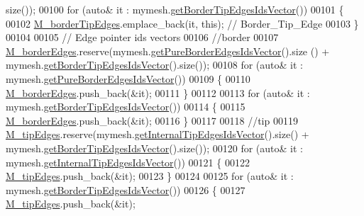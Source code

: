 \begin{DoxyCode}
      size());
00100     \textcolor{keywordflow}{for} (\textcolor{keyword}{auto}& it : mymesh.\hyperlink{classFVCode3D_1_1Rigid__Mesh_a12c92b683cfb3d9ac2645f038a8c6220}{getBorderTipEdgesIdsVector}())
00101     \{
00102         \hyperlink{classFVCode3D_1_1Rigid__Mesh_a712ea50f5237025e92af21799c5ec31b}{M\_borderTipEdges}.emplace\_back(it, \textcolor{keyword}{this}); \textcolor{comment}{// Border\_Tip\_Edge}
00103     \}
00104 
00105     \textcolor{comment}{// Edge pointer ids vectors}
00106     \textcolor{comment}{//border}
00107     \hyperlink{classFVCode3D_1_1Rigid__Mesh_af9ba7882baec8f8e5e7693a38f3cbc9b}{M\_borderEdges}.reserve(mymesh.\hyperlink{classFVCode3D_1_1Rigid__Mesh_ad18503d8be34525dd4ccbd7d6bc972c0}{getPureBorderEdgesIdsVector}().size
      () + mymesh.\hyperlink{classFVCode3D_1_1Rigid__Mesh_a12c92b683cfb3d9ac2645f038a8c6220}{getBorderTipEdgesIdsVector}().size());
00108     \textcolor{keywordflow}{for} (\textcolor{keyword}{auto}& it : mymesh.\hyperlink{classFVCode3D_1_1Rigid__Mesh_ad18503d8be34525dd4ccbd7d6bc972c0}{getPureBorderEdgesIdsVector}())
00109     \{
00110         \hyperlink{classFVCode3D_1_1Rigid__Mesh_af9ba7882baec8f8e5e7693a38f3cbc9b}{M\_borderEdges}.push\_back(&it);
00111     \}
00112 
00113     \textcolor{keywordflow}{for} (\textcolor{keyword}{auto}& it : mymesh.\hyperlink{classFVCode3D_1_1Rigid__Mesh_a12c92b683cfb3d9ac2645f038a8c6220}{getBorderTipEdgesIdsVector}())
00114     \{
00115         \hyperlink{classFVCode3D_1_1Rigid__Mesh_af9ba7882baec8f8e5e7693a38f3cbc9b}{M\_borderEdges}.push\_back(&it);
00116     \}
00117 
00118     \textcolor{comment}{//tip}
00119     \hyperlink{classFVCode3D_1_1Rigid__Mesh_a973940e6cd68e9980afec97fe94a70f4}{M\_tipEdges}.reserve(mymesh.\hyperlink{classFVCode3D_1_1Rigid__Mesh_a167962718f17ff75f349a1a072d1627b}{getInternalTipEdgesIdsVector}().size() +
       mymesh.\hyperlink{classFVCode3D_1_1Rigid__Mesh_a12c92b683cfb3d9ac2645f038a8c6220}{getBorderTipEdgesIdsVector}().size());
00120     \textcolor{keywordflow}{for} (\textcolor{keyword}{auto}& it : mymesh.\hyperlink{classFVCode3D_1_1Rigid__Mesh_a167962718f17ff75f349a1a072d1627b}{getInternalTipEdgesIdsVector}())
00121     \{
00122         \hyperlink{classFVCode3D_1_1Rigid__Mesh_a973940e6cd68e9980afec97fe94a70f4}{M\_tipEdges}.push\_back(&it);
00123     \}
00124 
00125     \textcolor{keywordflow}{for} (\textcolor{keyword}{auto}& it : mymesh.\hyperlink{classFVCode3D_1_1Rigid__Mesh_a12c92b683cfb3d9ac2645f038a8c6220}{getBorderTipEdgesIdsVector}())
00126     \{
00127         \hyperlink{classFVCode3D_1_1Rigid__Mesh_a973940e6cd68e9980afec97fe94a70f4}{M\_tipEdges}.push\_back(&it);

\end{DoxyCode}
